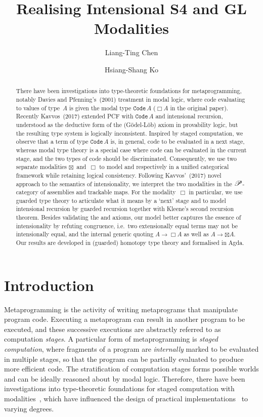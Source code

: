 \documentclass[a4paper,UKenglish,numberwithinsect,cleveref,thm-restate,draft]{lipics-v2021}
\title{Realising Intensional S4 and GL Modalities}
\author{Liang-Ting Chen}%
  {Institute of Information Science, Academia Sinica, Taiwan~\url{https://l-tchen.github.io}}%
  {liang.ting.chen.tw@gmail.com}%
  {https://orcid.org/0000-0002-3250-1331}{}
\author{Hsiang-Shang Ko}%
  {Institute of Information Science, Academia Sinica, Taiwan~\url{https://josh-hs-ko.github.io}}%
  {joshko@iis.sinica.edu.tw}%
  {https://orcid.org/0000-0002-2439-1048}{}
\numberwithin{equation}{section}
\theoremstyle{definition}
\theoremstyle{plain}
\begin{document}
\maketitle

\begin{abstract}

There have been investigations into type-theoretic foundations for metaprogramming, notably Davies and Pfenning's~(2001) treatment in \SFour modal logic, where code evaluating to values of type~$A$ is given the modal type $\mathtt{Code}\,A$ ($\Box A$ in the original paper).
Recently Kavvos~(2017) extended PCF with $\mathtt{Code}\,A$ and intensional recursion, understood as the deductive form of the \GL (Gödel-Löb) axiom in provability logic, but the resulting type system is logically inconsistent.
Inspired by staged computation, we observe that a term of type $\mathtt{Code}\,A$ is, in general, code to be evaluated in a next stage, whereas \SFour modal type theory is a special case where code can be evaluated in the current stage, and the two types of code should be discriminated.
Consequently, we use two separate modalities $\boxtimes$~and~$\Box$ to model \SFour and \GL respectively in a unified categorical framework while retaining logical consistency.
Following Kavvos'~(2017) novel approach to the semantics of intensionality, we interpret the two modalities in the $\mathscr{P}$-category of assemblies and trackable maps.
For the \GL modality~$\Box$ in particular, we use guarded type theory to articulate what it means by a `next' stage and to model intensional recursion by guarded recursion together with Kleene's second recursion theorem.
Besides validating the \SFour and \GL axioms, our model better captures the essence of intensionality by refuting congruence, i.e.\ two extensionally equal terms may not be intensionally equal, and the internal generic quoting $A \to \Box A$ as well as $A \to \boxtimes A$.%
Our results are developed in (guarded) homotopy type theory and formalised in Agda.
\end{abstract}

\section{Introduction}\label{sec:intro}

Metaprogramming is the activity of writing metaprograms that manipulate program code.
Executing a metaprogram can result in another program to be executed, and these successive executions are abstractly referred to as computation \emph{stages}.
A particular form of metaprogramming is \emph{staged computation}, where fragments of a program are \emph{internally} marked to be evaluated in multiple stages, so that the program can be partially evaluated to produce more efficient code.
The stratification of computation stages forms possible worlds and can be ideally reasoned about by modal logic.
Therefore, there have been investigations into type-theoretic foundations for staged computation with modalities~\cite{Davies2017,Davies2001b,Kavvos2017a,Nanevski2008}, which have influenced the design of practical implementations~\cite{Kiselyov2014,Sheard2002,Taha2000} to varying degrees.
\end{document}
